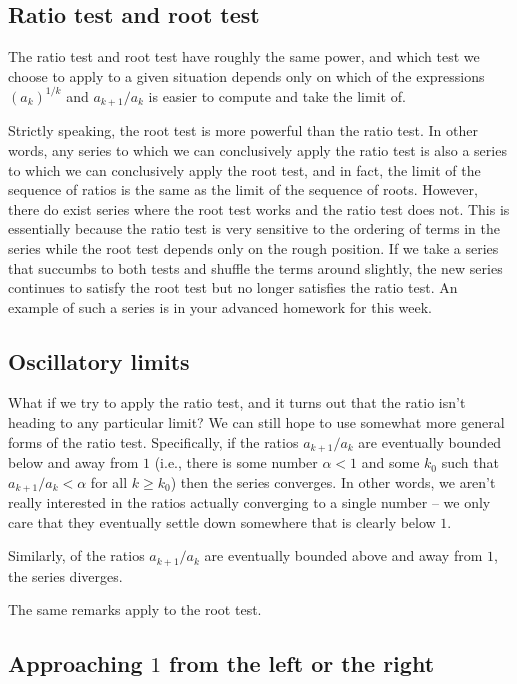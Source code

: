 \documentclass[10pt]{amsart}
\begin{document}
\subsection{Ratio test and root test}

The ratio test and root test have roughly the same power, and which
test we choose to apply to a given situation depends only on which of
the expressions $(a_k)^{1/k}$ and $a_{k+1}/a_k$ is easier to compute
and take the limit of.

Strictly speaking, the root test is more powerful than the ratio
test. In other words, any series to which we can conclusively apply
the ratio test is also a series to which we can conclusively apply the
root test, and in fact, the limit of the sequence of ratios is the
same as the limit of the sequence of roots. However, there do exist
series where the root test works and the ratio test does not. This is
essentially because the ratio test is very sensitive to the ordering
of terms in the series while the root test depends only on the rough
position. If we take a series that succumbs to both tests and shuffle
the terms around slightly, the new series continues to satisfy the
root test but no longer satisfies the ratio test. An example of such a
series is in your advanced homework for this week.

\subsection{Oscillatory limits}

What if we try to apply the ratio test, and it turns out that the
ratio isn't heading to any particular limit? We can still hope to use
somewhat more general forms of the ratio test. Specifically, if the
ratios $a_{k+1}/a_k$ are eventually bounded below and away from $1$
(i.e., there is some number $\alpha < 1$ and some $k_0$ such that
$a_{k+1}/a_k < \alpha$ for all $k \ge k_0$) then the series
converges. In other words, we aren't really interested in the ratios
actually converging to a single number -- we only care that they
eventually settle down somewhere that is clearly below $1$.

Similarly, of the ratios $a_{k+1}/a_k$ are eventually bounded above
and away from $1$, the series diverges.

The same remarks apply to the root test.

\subsection{Approaching $1$ from the left or the right}
\end{document}
